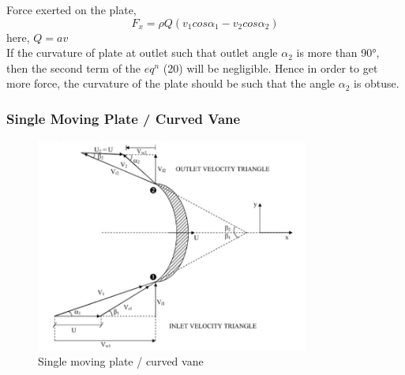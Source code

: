\documentclass{article}
\begin{document}
Force exerted on the plate,
\begin{equation}
  F_x = \rho Q (v_1 cos \alpha_1 - v_2 cos \alpha_2) \label{ex:eq20}
\end{equation}
here, $Q = a v$   \\

If the curvature of plate at outlet such that outlet angle $\alpha_2$ is more than 90°, then the second term of the $eq^n$ (20) will be negligible. Hence in order to get more force, the curvature of the plate should be such that the angle $\alpha_2$ is obtuse.  

\subsubsection*{Single Moving Plate / Curved Vane}
\begin{figure}[H]
  \centering
  \includegraphics[width=0.8\textwidth]{img/curved_vane.jpeg} 
  \caption{Single moving plate / curved vane}
  \label{fig:curved_vane}
\end{figure} 
\end{document}
